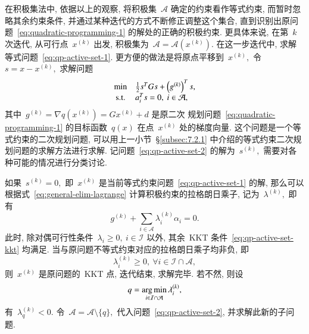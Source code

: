 在积极集法中, 依据以上的观察, 将积极集~$\mathcal{A}$ 确定的约束看作等式约束, 而暂时忽略其余约束条件, 并通过某种迭代的方式不断修正调整这个集合, 直到识别出原问题~\eqref{eq:quadratic-programming-1} 的解处的正确的积极约束. 更具体来说, 在第~$k$ 次迭代, 从可行点~${x}^{(k)}$ 出发, 
积极集为~$\mathcal{A} = \mathcal{A}({x}^{(k)}).$ 在这一步迭代中, 
求解等式问题~\eqref{eq:qp-active-set-1}. 更方便的做法是将原点平移到~${x}^{(k)},$ 令~${s} = {x} - {x}^{(k)},$ 求解问题
\begin{equation}
\label{eq:qp-active-set-2}
\begin{array}{cl}
\min & \frac{1}{2} {s}^T G {s} + \left( {g}^{(k)} \right)^T {s}, \\
{\rm s.t.} & {a}_i^T {s} = 0, ~ i \in \mathcal{A},
\end{array}
\end{equation}
其中~${g}^{(k)} = \nabla q({x}^{(k)}) = G {x}^{(k)} + {d}$ 是原二次
规划问题~\eqref{eq:quadratic-programming-1} 的目标函数~$q({x})$ 在点~${x}^{(k)}$ 处的梯度向量.  这个问题是一个等式约束的二次规划问题, 可以用上一小节~\S\ref{subsec:7.2.1} 中介绍的等式约束二次规划问题的求解方法进行求解. 记问题~\eqref{eq:qp-active-set-2} 的解为~${s}^{(k)},$ 需要对各种可能的情况进行分类讨论.

如果~${s}^{(k)} = {0},$ 即~${x}^{(k)}$ 是当前等式约束问题~\eqref{eq:qp-active-set-1} 的解, 那么可以根据式~\eqref{eq:general-elim-lagrange} 计算积极约束的拉格朗日乘子, 记为~${\lambda}^{(k)},$  即有
\begin{equation}
\label{eq:qp-active-set-lambda}
{g}^{(k)} + \sum\limits_{i \in \mathcal{A}} \lambda_i^{(k)} \alpha_i = 0.
\end{equation}
此时, 除对偶可行性条件~$\lambda_i \geqslant 0, ~ i \in \mathcal{I}$ 以外, 其余~KKT 
条件~\eqref{eq:qp-active-set-kkt} 均满足. 当与原问题不等式约束对应的拉格朗日乘子均非负, 即
\begin{equation*}
\lambda_i^{(k)} \geqslant 0, ~ \forall i \in \mathcal{I} \cap \mathcal{A},
\end{equation*}
则~$x^{(k)}$ 是原问题的~KKT 点, 迭代结束, 求解完毕. 若不然, 则设
\begin{equation}
\label{eq:qp-active-set-inactive-index}
q = \operatorname*{arg\,min}_{i \in \mathcal{I} \cap \mathcal{A}} \lambda_i^{(k)},
\end{equation}
有~$\lambda_q^{(k)} < 0.$ 令~$\mathcal{A} = \mathcal{A} \setminus \{ q \},$ 
代入问题~\eqref{eq:qp-active-set-2}, 并求解此新的子问题.

